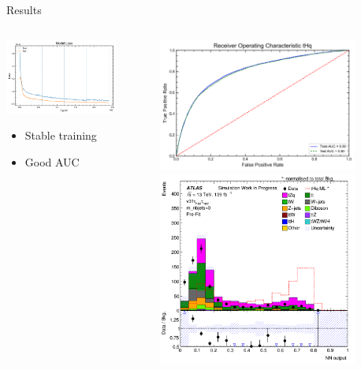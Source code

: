 \documentclass[10pt, UKenglish]{beamer}
\begin{document}
\begin{frame}{Results}
      \begin{columns}
        \begin{column}{0.5\textwidth}
          \includegraphics[width=0.8\textwidth]{losses_cat}
          \begin{itemize}
            \item Stable training
            \item Good AUC
          \end{itemize}
        \end{column}
        \begin{column}{0.5\textwidth}
          \includegraphics[width=0.8\textwidth]{ROC_cat}
          \includegraphics[width=0.8\textwidth]{response_cat}
        \end{column}
    \end{columns}    
\end{frame}


%
%

  
\end{document}
